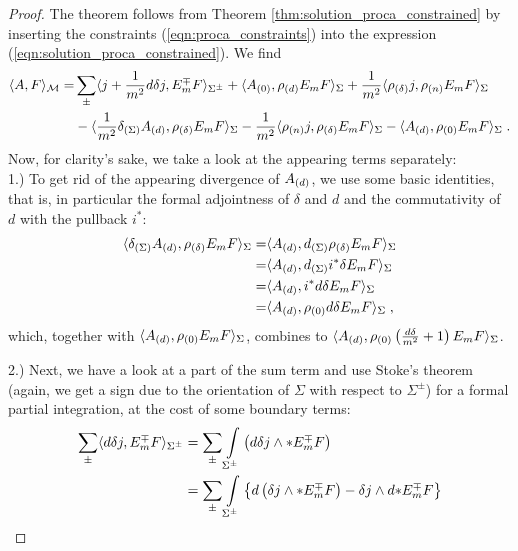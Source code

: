 \begin{proof}
The theorem follows from Theorem \ref{thm:solution_proca_constrained} by inserting the constraints (\ref{eqn:proca_constraints}) into the expression (\ref{eqn:solution_proca_constrained}).
We find
%
 \begin{align} \label{eqn:tmp_proca_solution_constraint_inserted}
  \langle A, F \rangle_{\mathcal{M}} =
  & \sum\limits_\pm \langle j + \frac{1}{m^2}d\delta j, E_m^\mp F   \rangle_{\Sigma^\pm}
  + \langle {A_{(0)}} , \rho_{(d)} E_m F \rangle_\Sigma
  + \frac{1}{m^2} \langle  \rho_{(\delta)} j, \rho_{(n)} E_m F \rangle_\Sigma \notag \\
  & - \langle \frac{1}{m^2} \delta_{(\Sigma)} {A_{(d)}} , \rho_{(\delta)} E_m F \rangle_\Sigma
  - \frac{1}{m^2} \langle \rho_{(n)} j, \rho_{(\delta)} E_m F \rangle_\Sigma
  - \langle {A_{(d)}}, \rho_{(0)} E_m F \rangle_\Sigma \;.
 \end{align}
%
Now, for clarity's sake, we take a look at the appearing terms separately:\\
1.) To get rid of the appearing divergence of ${A_{(d)}}$, we use some basic identities, that is, in particular the formal adjointness of $\delta$ and $d$ and the commutativity of $d$ with the pullback $i^*$:
\begin{align}
\langle \delta_{(\Sigma)} {A_{(d)}}, \rho_{(\delta)} E_m F \rangle_\Sigma
=& \langle {A_{(d)}}, d_{(\Sigma)} \rho_{(\delta)} E_m F  \rangle_\Sigma \notag\\
=& \langle {A_{(d)}}, d_{(\Sigma)} i^* \delta  E_m F \rangle_\Sigma \notag\\
=& \langle {A_{(d)}},  i^* d \delta  E_m F \rangle_\Sigma \notag \\
=& \langle {A_{(d)}}, \rho_{(0)} d \delta  E_m F \rangle_\Sigma \;,
\end{align}
which, together with $\langle {A_{(d)}}, \rho_{(0)} E_m F \rangle_\Sigma$,  combines to $\langle {A_{(d)}} , \rho_{(0)} \left( \frac{d \delta}{m^2} +1 \right) E_m F \rangle_\Sigma$. \par
%
2.) Next, we have a look at a part of the sum term and use Stoke's theorem (again, we get a sign due to the orientation of $\Sigma$ with respect to $\Sigma^\pm$) for a formal partial integration, at the cost of some boundary terms:
\begin{align}
\sum\limits_\pm \langle d \delta j ,  E_m^\mp F   \rangle_{\Sigma^\pm}
&= \sum\limits_\pm  \int\limits_{\Sigma^\pm}  \left( d \delta j \wedge {* E_m^\mp} F \right) \notag \\
&= \sum\limits_\pm  \int\limits_{\Sigma^\pm} \left\{ d \left(  \delta j \wedge {* E_m^\mp} F \right) - \delta j \wedge d {* E_m^\mp} F \right\} \notag\\

\end{align}
\end{proof}
